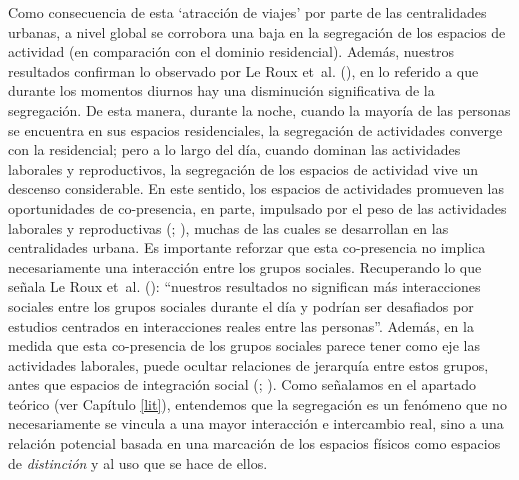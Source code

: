 \documentclass[
  spanish,
  a4paper,%
  chapterprefix=true,%
  DIV=calc,%
  twoside]{scrbook}%
\begin{document}
Como consecuencia de esta `atracción de viajes' por parte de las
centralidades urbanas, a nivel global se corrobora una baja en la
segregación de los espacios de actividad (en comparación con el dominio
residencial). Además, nuestros resultados confirman lo observado por
Le Roux et~al. (), en lo referido a que durante los momentos diurnos hay una
disminución significativa de la segregación. De esta manera, durante la
noche, cuando la mayoría de las personas se encuentra en sus espacios
residenciales, la segregación de actividades converge con la
residencial; pero a lo largo del día, cuando dominan las actividades
laborales y reproductivos, la segregación de los espacios de actividad
vive un descenso considerable. En este sentido, los espacios de
actividades promueven las oportunidades de co-presencia, en parte,
impulsado por el peso de las actividades laborales y reproductivas
(; ), muchas de las cuales se desarrollan en las
centralidades urbana. Es importante reforzar que esta co-presencia no
implica necesariamente una interacción entre los grupos sociales.
Recuperando lo que señala Le Roux et~al. (): ``nuestros resultados no
significan más interacciones sociales entre los grupos sociales durante
el día y podrían ser desafiados por estudios centrados en interacciones
reales entre las personas''. Además, en la medida que esta co-presencia
de los grupos sociales parece tener como eje las actividades laborales,
puede ocultar relaciones de jerarquía entre estos grupos, antes que
espacios de integración social (; ). Como
señalamos en el apartado teórico (ver Capítulo \ref{lit}), entendemos
que la segregación es un fenómeno que no necesariamente se vincula a una
mayor interacción e intercambio real, sino a una relación potencial
basada en una marcación de los espacios físicos como espacios de
\emph{distinción} y al uso que se hace de ellos.
\end{document}
